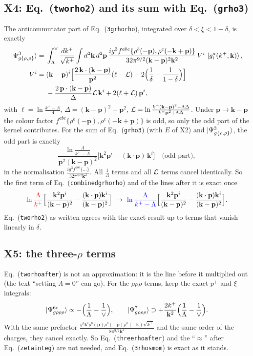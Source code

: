 \documentclass[10pt]{article}
\def\v#1{\mathbf{#1}}
\newcommand{\old}[1]{{\color{red}#1}}
\newcommand{\new}[1]{{\color{blue}#1}}
\newcommand{\eqn}[1]{Eq.~(\texttt{#1})}
\begin{document}
\subsection{X4: \eqn{tworho2} and its sum with \eqn{grho3}}
The anticommutator part of \eqn{3grhorho}, integrated over $\delta<\xi<1-\delta$, is exactly
\begin{align}
\ket{\Psi^3_{g\{\rho,\rho\}}}={}&\int_\Lambda^\vee\frac{dk^+}{\sqrt{k^+}}\int d^2\v k\,d^2\v p\,\frac{ig^3f^{abc}\{\rho^b(-\v p),\rho^c(-\v k+\v p)\}}{32\pi^{9/2}(\v k-\v p)^2\v k^2}\,V^i\,\ket{g^a_i(k^+,\v k)},\\
V^i={}&(\v k-\v p)^i\Big[\frac{2\,\v k\cdot(\v k-\v p)}{\v p^2}(\ell-{\cal L})-2\Big(\frac1\delta-\frac{1}{1-\delta}\Big)\Big]\notag\\
&-\frac{2\,\v p\cdot(\v k-\v p)}{\Delta}{\cal L}\,\v k^i+2(\ell+{\cal L})\,\v p^i,
\end{align}
with $\ell=\ln\frac{k^+-\Lambda}{\Lambda}$, $\Delta=(\v k-\v p)^2-\v p^2$, ${\cal L}=\ln\frac{k^+(\v k-\v p)^2-\Lambda\Delta}{k^+\v p^2+\Lambda\Delta}$. Under $\v p\to\v k-\v p$ the colour factor $f^{abc}\{\rho^b(-\v p),\rho^c(-\v k+\v p)\}$ is odd, so only the odd part of the kernel contributes. For the sum of \eqn{grho3} (with $E$ of X2) and $\ket{\Psi^3_{g\{\rho,\rho\}}}$, the odd part is exactly
\begin{equation}
\frac{\ln\frac{\Lambda}{k^+-\Lambda}}{\v p^2(\v k-\v p)^2}\Big[\v k^2\v p^i-(\v k\cdot\v p)\,\v k^i\Big]\quad\text{(odd part)},
\end{equation}
in the normalisation $\frac{ig^3f^{abc}\{\dots\}}{32\pi^{9/2}\v k^2}$. All $\frac1\Lambda$ terms and all ${\cal L}$ terms cancel identically. So the first term of \eqn{combinedgrhorho} and of the lines after it is exact once
\begin{equation}
\old{\ln\frac{\Lambda}{k^+}}\Big[\frac{\v k^2\v p^i}{(\v k-\v p)^2}-\frac{(\v k\cdot\v p)\v k^i}{(\v k-\v p)^2}\Big]\ \to\ \new{\ln\frac{\Lambda}{k^+-\Lambda}}\Big[\frac{\v k^2\v p^i}{(\v k-\v p)^2}-\frac{(\v k\cdot\v p)\v k^i}{(\v k-\v p)^2}\Big].
\end{equation}
\eqn{tworho2} as written agrees with the exact result up to terms that vanish linearly in $\delta$.

\subsection{X5: the three-$\rho$ terms}
\eqn{tworhoafter} is not an approximation: it is the line before it multiplied out (the text ``setting $\Lambda=0$'' can go). For the $\rho\rho\rho$ terms, keep the exact $p^+$ and $\xi$ integrals:
\begin{equation}
\ket{\Psi^{6c}_{g\rho\rho\rho}}\propto-\Big(\frac1\Lambda-\frac1\vee\Big),\qquad\ket{\Psi^7_{g\rho\rho\rho}}\supset+\frac{2k^+}{\v k^2}\Big(\frac1\Lambda-\frac1\vee\Big).
\end{equation}
With the same prefactor $\frac{g^3\v k^i\rho^b(\v p)\rho^b(-\v p)\rho^a(-\v k)\sqrt{k^+}}{8\pi^{9/2}\v k^4}$ and the same order of the charges, they cancel exactly. So \eqn{threerhoafter} and the ``$\approx$'' after \eqn{zetainteg} are not needed, and \eqn{3rhosmom} is exact as it stands.
\end{document}
